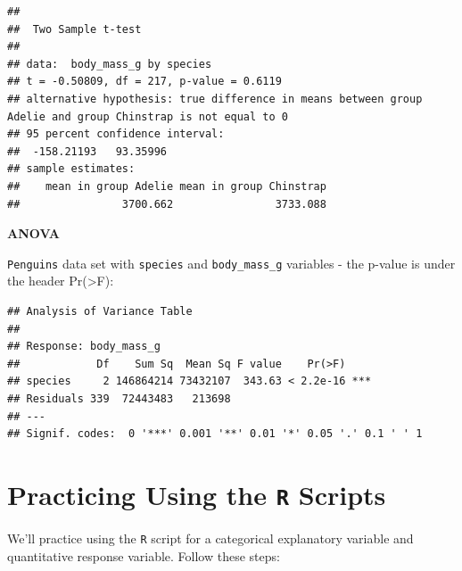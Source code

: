 \documentclass[
]{book}
\begin{document}
\begin{verbatim}
## 
##  Two Sample t-test
## 
## data:  body_mass_g by species
## t = -0.50809, df = 217, p-value = 0.6119
## alternative hypothesis: true difference in means between group Adelie and group Chinstrap is not equal to 0
## 95 percent confidence interval:
##  -158.21193   93.35996
## sample estimates:
##    mean in group Adelie mean in group Chinstrap 
##                3700.662                3733.088
\end{verbatim}

\textbf{ANOVA}

\texttt{Penguins} data set with \texttt{species} and \texttt{body\_mass\_g} variables - the p-value is under the header Pr(\textgreater F):

\begin{verbatim}
## Analysis of Variance Table
## 
## Response: body_mass_g
##            Df    Sum Sq  Mean Sq F value    Pr(>F)    
## species     2 146864214 73432107  343.63 < 2.2e-16 ***
## Residuals 339  72443483   213698                      
## ---
## Signif. codes:  0 '***' 0.001 '**' 0.01 '*' 0.05 '.' 0.1 ' ' 1
\end{verbatim}

\hypertarget{practicing-using-the-r-scripts}{%
\chapter*{\texorpdfstring{Practicing Using the \texttt{R} Scripts}{Practicing Using the R Scripts}}\label{practicing-using-the-r-scripts}}

We'll practice using the \texttt{R} script for a categorical explanatory variable and quantitative response variable. Follow these steps:
\end{document}
